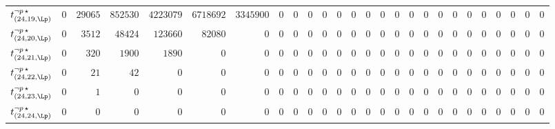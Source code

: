 \begin{tabular}{r|rrrrrrrrrrrrrrrrrrrrrrrrr}
  $t^{\neg p \, \star}_{(24,19,\Lp)}$ & $0$ & $29065$ & $852530$ & $4223079$ & $6718692$ & $3345900$ & $0$ & $0$ & $0$ & $0$ & $0$ & $0$ & $0$ & $0$ & $0$ & $0$ & $0$ & $0$ & $0$ & $0$ & $0$ & $0$ & $0$ & $0$ & $0$ \\
  $t^{\neg p \, \star}_{(24,20,\Lp)}$ & $0$ & $3512$ & $48424$ & $123660$ & $82080$ & $0$ & $0$ & $0$ & $0$ & $0$ & $0$ & $0$ & $0$ & $0$ & $0$ & $0$ & $0$ & $0$ & $0$ & $0$ & $0$ & $0$ & $0$ & $0$ & $0$ \\
  $t^{\neg p \, \star}_{(24,21,\Lp)}$ & $0$ & $320$ & $1900$ & $1890$ & $0$ & $0$ & $0$ & $0$ & $0$ & $0$ & $0$ & $0$ & $0$ & $0$ & $0$ & $0$ & $0$ & $0$ & $0$ & $0$ & $0$ & $0$ & $0$ & $0$ & $0$ \\
  $t^{\neg p \, \star}_{(24,22,\Lp)}$ & $0$ & $21$ & $42$ & $0$ & $0$ & $0$ & $0$ & $0$ & $0$ & $0$ & $0$ & $0$ & $0$ & $0$ & $0$ & $0$ & $0$ & $0$ & $0$ & $0$ & $0$ & $0$ & $0$ & $0$ & $0$ \\
  $t^{\neg p \, \star}_{(24,23,\Lp)}$ & $0$ & $1$ & $0$ & $0$ & $0$ & $0$ & $0$ & $0$ & $0$ & $0$ & $0$ & $0$ & $0$ & $0$ & $0$ & $0$ & $0$ & $0$ & $0$ & $0$ & $0$ & $0$ & $0$ & $0$ & $0$ \\
  $t^{\neg p \, \star}_{(24,24,\Lp)}$ & $0$ & $0$ & $0$ & $0$ & $0$ & $0$ & $0$ & $0$ & $0$ & $0$ & $0$ & $0$ & $0$ & $0$ & $0$ & $0$ & $0$ & $0$ & $0$ & $0$ & $0$ & $0$ & $0$ & $0$ & $0$ \\
\end{tabular}
